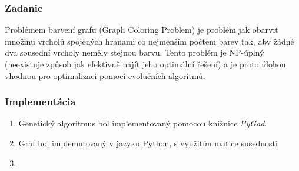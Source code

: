 





\begin{frame}
  \frametitle{Zadanie}
  Problémem barvení grafu (Graph Coloring Problem) je problém jak obarvit množinu vrcholů spojených hranami co nejmenším počtem barev tak, aby žádné dva sousední vrcholy neměly stejnou barvu. Tento problém je NP-úplný (neexistuje způsob jak efektivně najít jeho optimální řešení) a je proto úlohou vhodnou pro optimalizaci pomocí evolučních algoritmů.
  
\end{frame}


\begin{frame}
	\frametitle{Implementácia}
	
	\begin{enumerate}
		\item Genetický algoritmus bol implementovaný pomocou knižnice \emph{PyGad}.
		\item Graf bol implemntovaný v jazyku Python, s využitím matice susednosti
		\item 
	\end{enumerate}
\end{frame}

